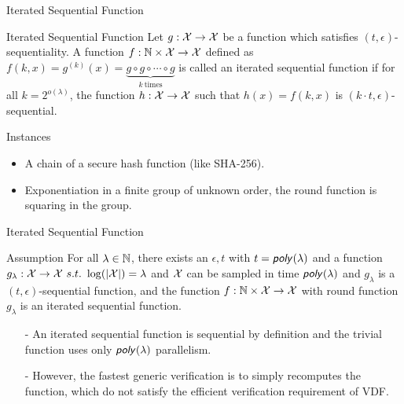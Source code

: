 \documentclass[UTF8]{beamer}
\begin{document}
	\begin{frame}{Iterated Sequential Function}
		\begin{block}{Iterated Sequential Function}
			Let $g:\mathcal{X}\to\mathcal{X}$ be a function which satisfies $(t,\epsilon)$-sequentiality. A function $f:\mathbb{N}\times\mathcal{X}\to\mathcal{X}$ defined as $f(k,x)=g^{(k)}(x)=\underbrace{g\circ g\circ\cdots\circ g}_{k~\text{times}}$ is called an iterated sequential function if for all $k=2^{o(\lambda)}$, the function $h:\mathcal{X}\to\mathcal{X}$ such that $h(x)=f(k,x)$ is $(k\cdot t,\epsilon)$-sequential.
		\end{block}
		\begin{block}{Instances}
			\begin{itemize}
				\item A chain of a secure hash function (like SHA-256).
				\item Exponentiation in a finite group of unknown order, the round function is squaring in the group.
			\end{itemize}
		\end{block}
	\end{frame}

	\begin{frame}{Iterated Sequential Function}
		\begin{block}{Assumption}
			For all $\lambda\in\mathbb{N}$, there exists an $\epsilon,t$ with $t=\textsf{\textit{poly}}(\lambda)$ and a function $g_\lambda:\mathcal{X}\to \mathcal{X}~s.t.~\log(|\mathcal{X}|)=\lambda$ and $\mathcal{X}$ can be sampled in time $\textsf{\textit{poly}}(\lambda)$ and $g_\lambda$ is a $(t,\epsilon)$-sequential function, and the function $f:\mathbb{N}\times\mathcal{X}\to\mathcal{X}$ with round function $g_\lambda$ is an iterated sequential function.
		\end{block}
		\begin{block}{}
			\begin{itemize}
				\item [-] An iterated sequential function is sequential by definition and the trivial function uses only $\textsf{\textit{poly}}(\lambda)$ parallelism.
				\item [-] However, the fastest generic verification is to simply recomputes the function, which do not satisfy the efficient verification requirement of VDF.
			\end{itemize}
		\end{block}
	\end{frame}
\end{document}
